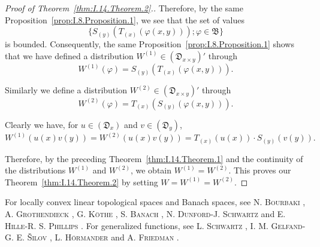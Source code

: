 \begin{proof}[Proof of Theorem~\ref{thm:I.14.Theorem.2}.]
Therefore, by the same Proposition~\ref{prop:I.8.Proposition.1}, we see that the set of values 
\begin{equation}\label{eq:I.14.10}
\{S_{(y)} \left(T_{(x)} (\varphi (x, y))\right); \varphi \in \mathfrak {B} \}
\end{equation}
is bounded. Consequently, the same Proposition~\ref{prop:I.8.Proposition.1} shows that we have defined a distribution $W^{(1)} \in (\mathfrak{D}_{x \times y})'$ through 
\begin{equation}\label{eq:I.14.11}
W ^{(1)} (\varphi) = S_{(y)} \left(T_{(x)} (\varphi (x, y))\right).
\end{equation}

Similarly we define a distribution $W^{(2)} \in (\mathfrak{D}_{x \times y})'$ through 
\begin{equation}\label{eq:I.14.12}
W ^{(2)} (\varphi) = T_{(x)} \left(S_{(y)} (\varphi (x, y))\right).
\end{equation}

Clearly we have, for $u \in (\mathfrak{D}_x)$ and $v \in (\mathfrak{D}_y)$, 
\begin{equation}\label{eq:I.14.13}
W ^{(1)} (u (x) v (y)) = W ^{(2)} (u (x) v (y)) = T_{(x)} (u (x)) \cdot S_{(y)} (v (y)).
\end{equation}

Therefore, by the preceding Theorem~\ref{thm:I.14.Theorem.1} and the continuity of the distributions $W^{(1)}$ and $W^{(2)}$, we obtain $W^{(1)} = W^{(2)}$. This proves our Theorem~\ref{thm:I.14.Theorem.2} by setting $W = W^{(1)} = W^{(2)}$. 
\end{proof}


For locally convex linear topological spaces and Banach spaces, see N. \textsc{Bourbaki} \cite{bourbaki27}, A. \textsc{Grothendieck} \cite{grothendieck87}, G. \textsc{Köthe} \cite{konishi164}, S. \textsc{Banach} \cite{banach9}, N. \textsc{Dunford}-J. \textsc{Schwartz} \cite{dunford44} and E. \textsc{Hille}-R. S. \textsc{Phillips} \cite{hille97}. For generalized functions, see L. \textsc{Schwartz} \cite{schwartz294}, I. M. \textsc{Gelfand}-G. E. \textsc{Šilov} \cite{gelfand76}, L. \textsc{Hörmander} \cite{hormander118} and A. \textsc{Friedman} \cite{friedman68}. 
